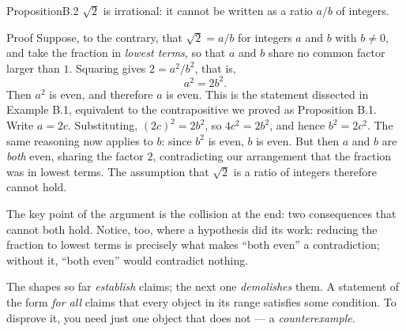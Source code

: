 \documentclass[a4paper,12pt,oneside]{memoir}
\begin{document}
\begin{envproposition}{Proposition}{B.2}{}
\(\sqrt{2}\) is irrational: it cannot be written as a ratio \(a/b\) of integers.
\end{envproposition}
\begin{envproof}{Proof}{}{}
Suppose, to the contrary, that \(\sqrt{2} = a/b\) for integers \(a\) and \(b\) with \(b \neq 0\), and take the fraction in \emph{lowest terms}, so that \(a\) and \(b\) share no common factor larger than \(1\). Squaring gives \(2 = a^{2}/b^{2}\), that is, \[ a^{2} = 2b^{2}. \] Then \(a^{2}\) is even, and therefore \(a\) is even. This is the statement dissected in Example B.1, equivalent to the contrapositive we proved as Proposition B.1. Write \(a = 2c\). Substituting, \((2c)^{2} = 2b^{2}\), so \(4c^{2} = 2b^{2}\), and hence \(b^{2} = 2c^{2}\). The same reasoning now applies to \(b\): since \(b^{2}\) is even, \(b\) is even. But then \(a\) and \(b\) are \emph{both} even, sharing the factor \(2\), contradicting our arrangement that the fraction was in lowest terms. The assumption that \(\sqrt{2}\) is a ratio of integers therefore cannot hold. \qedmark
\end{envproof}
The key point of the argument is the collision at the end: two consequences that cannot both hold. Notice, too, where a hypothesis did its work: reducing the fraction to lowest terms is precisely what makes “both even” a contradiction; without it, “both even” would contradict nothing.

 The shapes so far \emph{establish} claims; the next one \emph{demolishes} them. A statement of the form \emph{for all} claims that every object in its range satisfies some condition. To disprove it, you need just one object that does not — a \emph{counterexample}.
\end{document}
